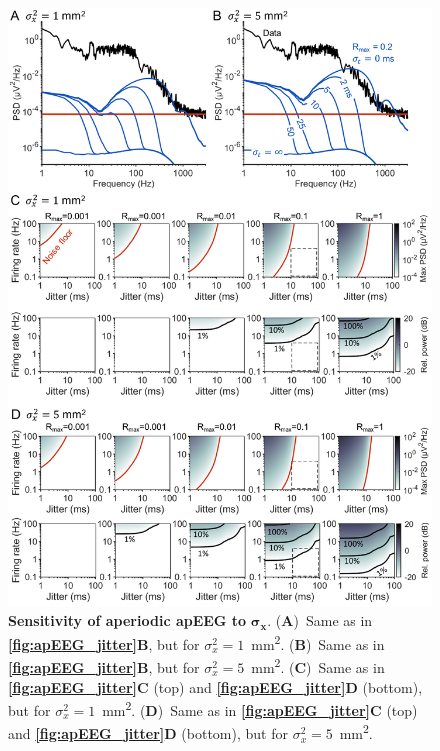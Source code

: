 \begin{figure}[h!]
    \centering
    \includegraphics[width=13.2cm]{Figures/chapter3/figureS5.png}
    \caption{\textbf{Sensitivity of aperiodic apEEG to }$\bm{\sigma_x}$. (\textbf{A})~Same as in \textbf{\autoref{fig:apEEG_jitter}B}, but for $\sigma^2_x=1$~\unit{\milli\meter^2}. (\textbf{B})~Same as in \textbf{\autoref{fig:apEEG_jitter}B}, but for $\sigma^2_x=5$~\unit{\milli\meter^2}. (\textbf{C})~Same as in \textbf{\autoref{fig:apEEG_jitter}C} (top) and \textbf{\autoref{fig:apEEG_jitter}D} (bottom), but for $\sigma^2_x=1$~\unit{\milli\meter^2}. (\textbf{D})~Same as in \textbf{\autoref{fig:apEEG_jitter}C} (top) and \textbf{\autoref{fig:apEEG_jitter}D} (bottom), but for $\sigma^2_x=5$~\unit{\milli\meter^2}.} 
    \label{fig:jitter_sigx}
\end{figure}

